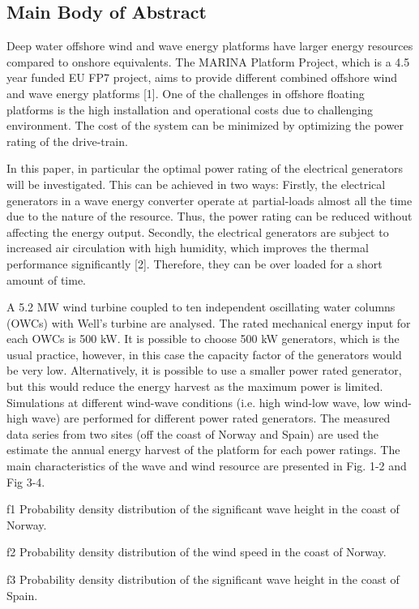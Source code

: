 \documentclass[twoside]{article}
\begin{document}
\begin{multicols}{2}
\section{Main Body of Abstract}

Deep water offshore wind and wave energy platforms have larger energy resources compared to onshore equivalents. The MARINA Platform Project, which is a 4.5 year funded EU FP7 project, aims to provide different combined offshore wind and wave energy platforms [1]. One of the challenges in offshore floating platforms is the high installation and operational costs due to challenging environment. The cost of the system can be minimized by optimizing the power rating of the drive-train. 

In this paper, in particular the optimal power rating of the electrical generators will be investigated. This can be achieved in two ways: Firstly, the electrical generators in a wave energy converter operate at partial-loads almost all the time due to the nature of the resource. Thus, the power rating can be reduced without affecting the energy output. Secondly, the electrical generators are subject to increased air circulation with high humidity, which improves the thermal performance significantly [2]. Therefore, they can be over loaded for a short amount of time.

A 5.2 MW wind turbine coupled to ten independent oscillating water columns (OWCs) with Well's turbine are analysed. The rated mechanical energy input for each OWCs is 500 kW. It is possible to choose 500 kW generators, which is the usual practice, however, in this case the capacity factor of the generators would be very low. Alternatively, it is possible to use a smaller power rated generator, but this would reduce the energy harvest as the maximum power is limited. Simulations at different wind-wave conditions (i.e. high wind-low wave, low wind-high wave) are performed for different power rated generators. The measured data series from two sites (off the coast of Norway and Spain) are used the estimate the annual energy harvest of the platform for each power ratings. The main characteristics of the wave and wind resource are presented in Fig. 1-2 and Fig 3-4.

{f1} Probability density distribution of the significant wave height in the coast of Norway.

{f2} Probability density distribution of the wind speed in the coast of Norway.

{f3} Probability density distribution of the significant wave height in the coast of Spain.


\end{multicols}
\end{document}
